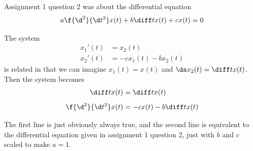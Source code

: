 \documentclass[a4paper]{article}
\begin{document}
\subsection{~}

Assignment 1 question 2 was about the differential equation $$a \f{\d^2}{\d t^2}x(t) + b \diff t x(t) + cx(t) = 0$$

The system \begin{align*}
	x_1'(t) &= x_2(t)\\[1ex]
	x_2'(t) &= -c x_1(t) - b x_2(t)
\end{align*}is related in that we can imagine $x_1(t) = x(t)$ and $\ds x_2(t) = \diff t x(t)$. Then the system becomes \begin{align*}
	\diff t x(t)          &= \diff t x(t)\\[1ex]
	\f{\d^2}{\d t^2} x(t) &= -c x(t) - b \diff t x(t)
\end{align*}

The first line is just obviously always true, and the second line is equivalent to the differential equation given in assignment 1 question 2, just with $b$ and $c$ scaled to make $a=1$.
\end{document}
